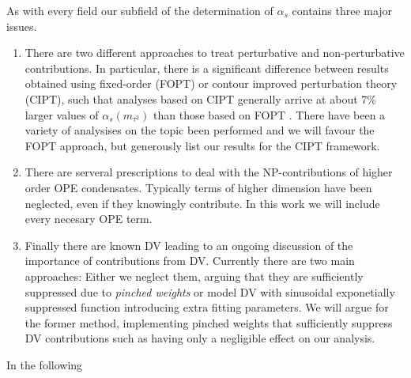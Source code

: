 \documentclass[../../index.tex]{subfiles}
\begin{document}
As with every field our subfield of the determination of $\alpha_s$ contains
three major issues.
\begin{enumerate}
  \item There are two different approaches to treat perturbative and non-perturbative
contributions. In particular, there is a significant difference between results
obtained using fixed-order (FOPT) or contour improved perturbation theory
(CIPT), such that analyses based on CIPT generally arrive at about 7\% larger
values of $\alpha_s(m_{\tau^2})$ than those based on FOPT \cite{PDG2018}.
There have been a variety of analysises on the topic been performed
\cite{Pich2013,Caprini2009,Jamin2005} and we will favour the FOPT approach,
but generously list our results for the CIPT framework.

  \item There are serveral prescriptions to deal with the NP-contributions of
    higher order OPE condensates. Typically terms of higher dimension have been
    neglected, even if they knowingly contribute. In this work we will include
    every necesary OPE term.

  \item Finally there are known DV leading to an ongoing discussion of the
importance of contributions from DV. Currently there are two main approaches:
Either we neglect them, arguing that they are sufficiently suppressed due to
\textit{pinched weights} \cite{Pich2016} or model DV with sinusoidal
exponetially suppressed function \cite{Cata2008,Boito2011,Boito2014} introducing
extra fitting parameters. We will argue for the former method, implementing
pinched weights that sufficiently suppress DV contributions such as having only a negligible effect on our analysis.
\end{enumerate}

In the following 
\end{document}
